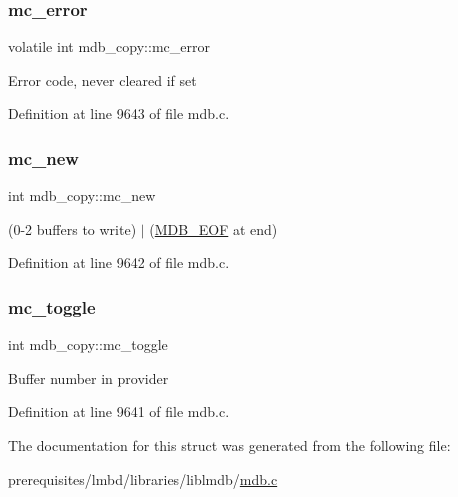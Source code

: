 \subsubsection{\texorpdfstring{mc\+\_\+error}{mc\_error}}
{\footnotesize\ttfamily volatile int mdb\+\_\+copy\+::mc\+\_\+error}

Error code, never cleared if set 

Definition at line 9643 of file mdb.\+c.

\mbox{\label{structmdb__copy_ad0b5ae51d58c4d5e227931c00e955b86}} 
\subsubsection{\texorpdfstring{mc\+\_\+new}{mc\_new}}
{\footnotesize\ttfamily int mdb\+\_\+copy\+::mc\+\_\+new}

(0-\/2 buffers to write) $\vert$ (\mbox{\hyperlink{group__internal_ga21baf54777b0859e49ca44ac0e336863}{M\+D\+B\+\_\+\+E\+OF}} at end) 

Definition at line 9642 of file mdb.\+c.

\mbox{\label{structmdb__copy_a1c11af71f83f104842d8d185f63bdf3b}} 
\subsubsection{\texorpdfstring{mc\+\_\+toggle}{mc\_toggle}}
{\footnotesize\ttfamily int mdb\+\_\+copy\+::mc\+\_\+toggle}

Buffer number in provider 

Definition at line 9641 of file mdb.\+c.



The documentation for this struct was generated from the following file\+:\begin{DoxyCompactItemize}
\item 
prerequisites/lmbd/libraries/liblmdb/\mbox{\hyperlink{mdb_8c}{mdb.\+c}}\end{DoxyCompactItemize}

